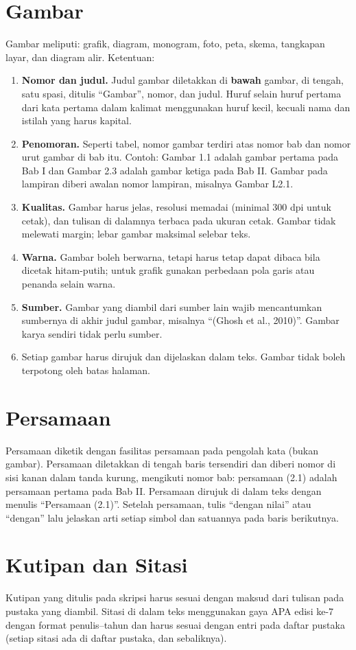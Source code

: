 \section{Gambar}
Gambar meliputi: grafik, diagram, monogram, foto, peta, skema, tangkapan layar, dan diagram alir. Ketentuan:
\begin{enumerate}
\item \textbf{Nomor dan judul.} Judul gambar diletakkan di \textbf{bawah} gambar, di tengah, satu spasi, ditulis “Gambar”, nomor, dan judul. Huruf selain huruf pertama dari kata pertama dalam kalimat menggunakan huruf kecil, kecuali nama dan istilah yang harus kapital.
\item \textbf{Penomoran.} Seperti tabel, nomor gambar terdiri atas nomor bab dan nomor urut gambar di bab itu. Contoh: Gambar 1.1 adalah gambar pertama pada Bab I dan Gambar 2.3 adalah gambar ketiga pada Bab II. Gambar pada lampiran diberi awalan nomor lampiran, misalnya Gambar L2.1.
\item \textbf{Kualitas.} Gambar harus jelas, resolusi memadai (minimal 300 dpi untuk cetak), dan tulisan di dalamnya terbaca pada ukuran cetak. Gambar tidak melewati margin; lebar gambar maksimal selebar teks.
\item \textbf{Warna.} Gambar boleh berwarna, tetapi harus tetap dapat dibaca bila dicetak hitam-putih; untuk grafik gunakan perbedaan pola garis atau penanda selain warna.
\item \textbf{Sumber.} Gambar yang diambil dari sumber lain wajib mencantumkan sumbernya di akhir judul gambar, misalnya “(Ghosh et al., 2010)”. Gambar karya sendiri tidak perlu sumber.
\item Setiap gambar harus dirujuk dan dijelaskan dalam teks. Gambar tidak boleh terpotong oleh batas halaman.
\end{enumerate}

\section{Persamaan}
Persamaan diketik dengan fasilitas persamaan pada pengolah kata (bukan gambar). Persamaan diletakkan di tengah baris tersendiri dan diberi nomor di sisi kanan dalam tanda kurung, mengikuti nomor bab: persamaan (2.1) adalah persamaan pertama pada Bab II. Persamaan dirujuk di dalam teks dengan menulis “Persamaan (2.1)”. Setelah persamaan, tulis “dengan nilai” atau “dengan” lalu jelaskan arti setiap simbol dan satuannya pada baris berikutnya.

\section{Kutipan dan Sitasi}
Kutipan yang ditulis pada skripsi harus sesuai dengan maksud dari tulisan pada pustaka yang diambil. Sitasi di dalam teks menggunakan gaya APA edisi ke-7 dengan format penulis--tahun dan harus sesuai dengan entri pada daftar pustaka (setiap sitasi ada di daftar pustaka, dan sebaliknya).

